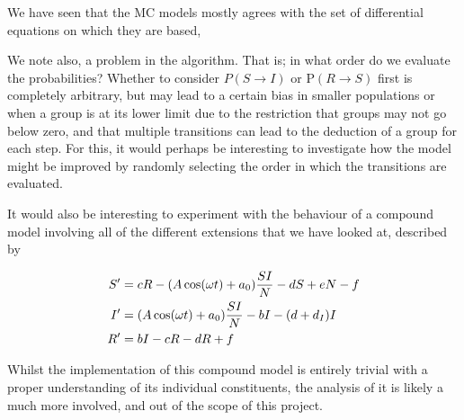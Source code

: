 \documentclass[10pt,showpacs,preprintnumbers,amsmath,amssymb,nofootinbib,aps,prl,twocolumn,groupedaddress,superscriptaddress,showkeys]{revtex4-1}
\begin{document}
  We have seen that the MC models mostly agrees with the set of differential equations on which they are based, 

  We note also, a problem in the algorithm. That is; in what order do we evaluate the probabilities?
  Whether to consider $P(S\rightarrow I)$ or P$(R\rightarrow S)$ first is completely arbitrary, but may lead to a certain bias in smaller populations or when a group is at its lower limit due to the restriction that groups may not go below zero, and that multiple transitions can lead to the deduction of a group for each step. For this, it would perhaps be interesting to investigate how the model might be improved by randomly selecting the order in which the transitions are evaluated.

  It would also be interesting to experiment with the behaviour of a compound model involving all of the different extensions that we have looked at, described by

  \begin{align}
     \begin{split}
        S' &= cR - \qty(A\cos(\omega t) + a_0)\frac{SI}{N} - dS + eN - f \\
        I' &= \qty(A\cos(\omega t)+a_0)\frac{SI}{N} - bI  - (d + d_I)I \\
        R' &= bI - cR - dR + f
     \end{split}
  \end{align} 

   Whilst the implementation of this compound model is entirely trivial with a proper understanding of its individual constituents, the analysis of it is likely a much more involved, and out of the scope of this project.



\end{document}
